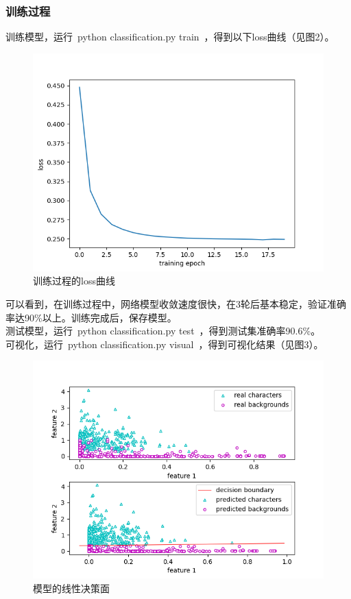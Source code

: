 \documentclass[UTF8, a4paper]{article}
\begin{document}
\subsubsection{训练过程}
训练模型，运行\ python classification.py train\ ，得到以下loss曲线（见图2）。\\
\begin{figure}
    \centering
    \includegraphics[width=12cm]{Fig2.png}
    \caption{训练过程的loss曲线}
\end{figure}
可以看到，在训练过程中，网络模型收敛速度很快，在3轮后基本稳定，验证准确率达90\%以上。训练完成后，保存模型。\\
测试模型，运行\ python classification.py test\ ，得到测试集准确率90.6\%。\\
可视化，运行\ python classification.py visual\ ，得到可视化结果（见图3）。
\begin{figure}
    \centering
    \includegraphics[width=12cm]{Fig3.png}
    \caption{模型的线性决策面}
\end{figure}
\end{document}
